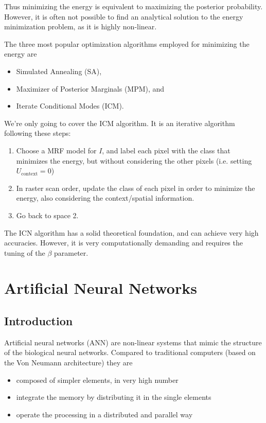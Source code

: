 \documentclass[oneside,onecolumn]{report}
\begin{document}
Thus minimizing the energy is equivalent to maximizing the posterior probability.
However, it is often not possible to find an analytical solution to the energy minimization problem, as it is highly non-linear.

The three most popular optimization algorithms employed for minimizing the energy are
\begin{itemize}
    \item Simulated Annealing (SA),
    \item Maximizer of Posterior Marginals (MPM), and
    \item Iterate Conditional Modes (ICM).
\end{itemize}

We're only going to cover the ICM algorithm.
It is an iterative algorithm following these steps:
\begin{enumerate}
    \item Choose a MRF model for $I$, and label each pixel with the class that minimizes the energy, but without considering the other pixels (i.e. setting $U_\text{context} = 0$)
    \item In raster scan order, update the class of each pixel in order to minimize the energy, also considering the context/spatial information.
    \item Go back to space 2.
\end{enumerate}

The ICN algorithm has a solid theoretical foundation, and can achieve very high accuracies.
However, it is very computationally demanding and requires the tuning of the $\beta$ parameter.


\clearpage
\chapter{Artificial Neural Networks}
\section{Introduction}
Artificial neural networks (ANN) are non-linear systems that mimic the structure of the biological neural networks.
Compared to traditional computers (based on the Von Neumann architecture) they are
\begin{itemize}
    \item composed of simpler elements, in very high number
    \item integrate the memory by distributing it in the single elements
    \item operate the processing in a distributed and parallel way
\end{itemize}
\end{document}

